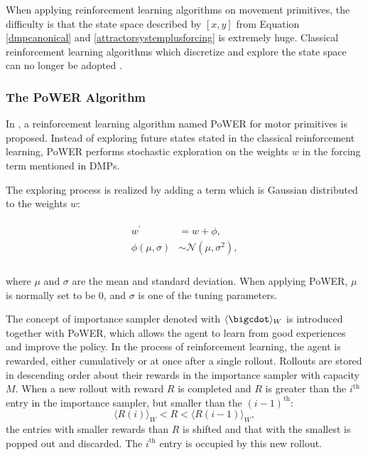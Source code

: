 When applying reinforcement learning algorithms on movement primitives, the difficulty is that the state space described by $ \left[x,y\right] $ from Equation {\ref{dmpcanonical}} and {\ref{attractorsystemplusforcing}} is extremely huge. Classical reinforcement learning algorithms which discretize and explore the state space can no longer be adopted \cite{kober2009learning}. 

\subsubsection{The PoWER Algorithm}
In \cite{kober2009policy,kober2009learning}, a reinforcement learning algorithm named \ac{PoWER} for motor primitives is proposed. Instead of exploring future states stated in the classical reinforcement learning, PoWER performs stochastic exploration on the weights $ w $ in the forcing term mentioned in DMPs.

The exploring process is realized by adding a term which is Gaussian distributed to the weights $ w $:

\begin{align}
	\begin{split}
		w^\prime &= w+\phi,\\
		\phi\left(\mu,\sigma\right)&\sim\mathcal{N}\left(\mu,\sigma^2\right),\\
	\end{split}
\end{align}

where $ \mu $ and  $ \sigma $ are the mean and standard deviation. When applying PoWER, $ \mu $ is normally set to be 0, and $ \sigma $ is one of the tuning parameters.

The concept of importance sampler denoted with $ \langle\bigcdot\rangle _W$ is introduced together with PoWER, which allows the agent to learn from good experiences and improve the policy. In the process of reinforcement learning, the agent is rewarded, either cumulatively or at once after a single rollout. Rollouts are stored in descending order about their rewards in the importance sampler with capacity $ M $. When a new rollout with reward $ R $ is completed and $ R $ is greater than the $ i^{\mathrm{th}} $ entry in the importance sampler, but smaller than the $ (i-1)^{\mathrm{th}} $:
\begin{equation*}
	{\langle R(i) \rangle}_{W}<R<{\langle R(i-1) \rangle}_{W},
\end{equation*} 
the entries with smaller rewards than $ R $ is shifted and that with the smallest is popped out and discarded. The $ i^{\mathrm{th}} $ entry is occupied by this new rollout.


